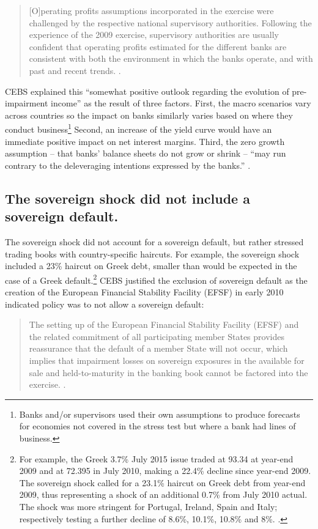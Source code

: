 \documentclass[12pt]{article}
\begin{document}
\begin{quote}
[O]perating profits assumptions incorporated in the exercise were challenged by the respective national supervisory authorities. Following the experience of the 2009 exercise, supervisory authorities are usually confident that operating profits estimated for the different banks are consistent with both the environment in which the banks operate, and with past and recent trends. \citet{Methodology}.
\end{quote}

CEBS explained this ``somewhat positive outlook regarding the evolution of pre-impairment income'' as the result of three factors. First, the macro scenarios vary across countries so the impact on banks similarly varies based on where they conduct business\footnote{Banks and/or supervisors used their own assumptions to produce forecasts for economies not covered in the stress test but where a bank had lines of business.} Second, an increase of the yield curve would have an immediate positive impact on net interest margins. Third, the zero growth assumption -- that banks' balance sheets do not grow or shrink -- ``may run contrary to the deleveraging intentions expressed by the banks.'' \citet{Methodology}.

\subsection{The sovereign shock did not include a sovereign default.}

The sovereign shock did not account for a sovereign default, but rather stressed trading books with country-specific haircuts. For example, the sovereign shock included a 23\% haircut on Greek debt, smaller than would be expected in the case of a Greek default.\footnote{For example, the Greek 3.7\% July 2015 issue traded at 93.34 at year-end 2009 and at 72.395 in July 2010, making a 22.4\% decline since year-end 2009. The sovereign shock called for a 23.1\% haircut on Greek debt from year-end 2009, thus representing a shock of an additional 0.7\% from July 2010 actual. The shock was more stringent for Portugal, Ireland, Spain and Italy; respectively testing a further decline of 8.6\%, 10.1\%, 10.8\% and 8\%. \citep{Nielsen}.} CEBS justified the exclusion of sovereign default as the creation of the European Financial Stability Facility (EFSF) in early 2010 indicated policy was to not allow a sovereign default:

\begin{quote}
The setting up of the European Financial Stability Facility (EFSF) and the related commitment of all participating member States provides reassurance that the default of a member State will not occur, which implies that impairment losses on sovereign exposures in the available for sale and held-to-maturity in the banking book cannot be factored into the exercise. \citep{QA}.
\end{quote}
\end{document}
